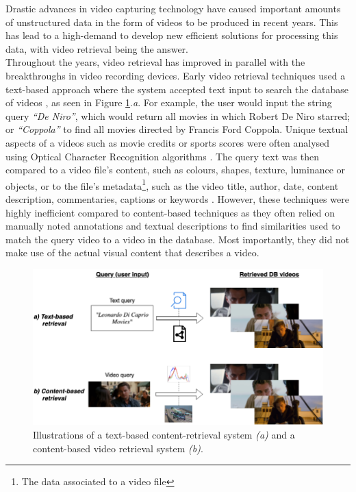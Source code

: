Drastic advances in video capturing technology have caused important amounts of unstructured data in the form of videos to be produced in recent years. This has lead to a high-demand to develop new efficient solutions for processing this data, with video retrieval being the answer.\\

Throughout the years, video retrieval has improved in parallel with the breakthroughs in video recording devices. Early video retrieval techniques used a text-based approach where the system accepted text input to search the database of videos \cite{lai2015trajectory}, as seen in Figure \ref{fig:text_vs_content_retrieval}.\emph{a}. For example, the user would input the string query \textit{``De Niro''}, which would return all movies in which Robert De Niro starred; or \textit{``Coppola''} to find all movies directed by Francis Ford Coppola. Unique textual aspects of a videos such as movie credits or sports scores were often analysed using Optical Character Recognition algorithms \cite{li2002text}. The query text was then compared to a video file's content, such as colours, shapes, texture, luminance or objects, or to the file's metadata\footnote{The data associated to a video file}, such as the video title, author, date, content description, commentaries, captions or keywords \cite{li2002text} \cite{feng2011} \cite{patel2012}. However, these techniques were highly inefficient compared to content-based techniques as they often relied on manually noted annotations and textual descriptions to find similarities used to match the query video to a video in the database. Most importantly, they did not make use of the actual visual content that describes a video.\\

\begin{figure}[h]
\centerline{\includegraphics[width=\textwidth]{figures/litsurvey/content_text-retrieval_comparison.png}}
\caption{\label{fig:text_vs_content_retrieval}Illustrations of a text-based content-retrieval system \emph{(a)} and a content-based video retrieval system \emph{(b)}.}
\end{figure}

